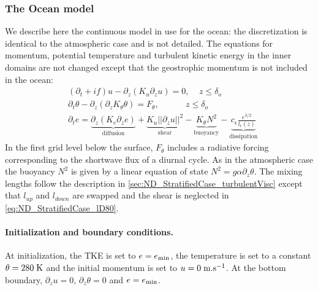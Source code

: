 \subsubsection{The Ocean model}
We describe here the continuous model in use for the ocean:
the discretization is identical to the atmospheric case
and is not detailed.
The equations for momentum, potential temperature and
turbulent kinetic energy in the inner domains are not changed
except that the geostrophic momentum is not included in the ocean:
\begin{equation}
	\begin{aligned}
	&(\partial_t + if) u - \partial_z (K_u \partial_z u) = 0
		,~~~~~ z \leq \delta_{o} \\
	&\partial_t \theta -\partial_z (\partial_z K_{\theta} \theta)
	= F_{\theta},~~~~~~~~~~~~~~ z \leq \delta_{o} \\
		&\partial_t e =
    \underbrace{\partial_z \left(K_e
    \partial_z e\right)}_{\text{diffusion}}
    + \underbrace{K_u ||\partial_z u||^2}_{\text{shear}} 
    - \underbrace{K_{\theta} N^2 }_{\text{buoyancy}}
    - \underbrace{c_{\epsilon}
    \frac{e^{3/2}}{l_{\epsilon}(z)}}_{\text{dissipation}}
	\end{aligned}
\end{equation}
In the first grid level below the surface, $F_\theta$ includes a
radiative forcing corresponding to the shortwave flux of a
diurnal cycle. As in the atmospheric case the buoyancy $N^2$ is
given by a linear equation of state
$N^2 = g \alpha \partial_z \theta$.
The mixing lengths follow the description in 
\ref{sec:ND_StratifiedCase_turbulentVisc}
except that $l_{up}$ and $l_{down}$ are swapped and the shear
is neglected in \eqref{eq:ND_StratifiedCase_lD80}.
%
\paragraph{Initialization and boundary conditions.}
At initialization, the TKE is set to $e=e_{\rm min}$, 
the temperature is set to a constant $\theta = 280 \; {\rm K}$
and the initial momentum is set to $u = 0 \; {\rm m}.{\rm s}^{-1}$.
At the bottom boundary,
$\partial_z u = 0$,
$\partial_z \theta = 0$ and $e=e_{\rm min}$.


